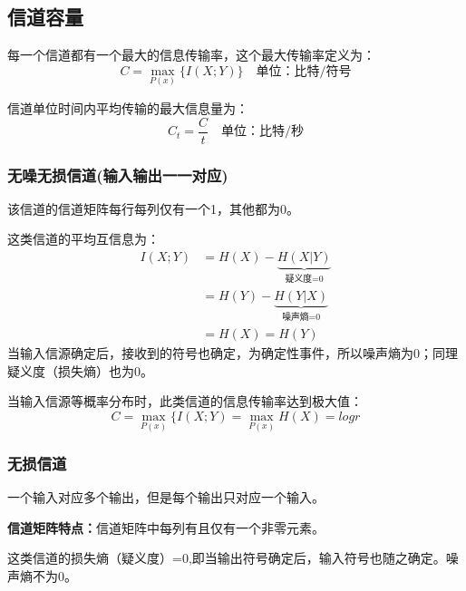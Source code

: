 \documentclass[UTF8]{ctexart} %
\begin{document}
		\subsection{信道容量}	
			每一个信道都有一个最大的信息传输率，这个最大传输率定义为：
			\[C = \max_{P(x)}\{I(X;Y)\}\quad \text{单位：比特/符号}\]
			
			信道单位时间内平均传输的最大信息量为：
			\[C_t = \frac{C}{t}\quad \text{单位：比特/秒}\]
			
		\subsubsection{无噪无损信道(输入输出一一对应)}
			该信道的信道矩阵每行每列仅有一个1，其他都为0。
			
			这类信道的平均互信息为：
			 \[\begin{aligned}
			 I(X;Y) &= H(X) - \underbrace{H(X|Y)}_{\text{疑义度=0}}\\
			 & =H(Y)-\underbrace{H(Y|X)}_{\text{噪声熵=0}}\\
			 &  =H(X) = H(Y)
			 \end{aligned}\]
			 当输入信源确定后，接收到的符号也确定，为确定性事件，所以噪声熵为0；同理疑义度（损失熵）也为0。
			 
			 当输入信源等概率分布时，此类信道的信息传输率达到极大值：
			 \[C = \max_{P(x)}\{I(X;Y) = \max_{P(x)}H(X) = logr\]
		\subsubsection{无损信道}	
			一个输入对应多个输出，但是每个输出只对应一个输入。
			\begin{figure}[H]
			\end{figure}
			
			\textbf{信道矩阵特点：}信道矩阵中每列有且仅有一个非零元素。
			
			这类信道的损失熵（疑义度）=0,即当输出符号确定后，输入符号也随之确定。噪声熵不为0。
			
\end{document}
